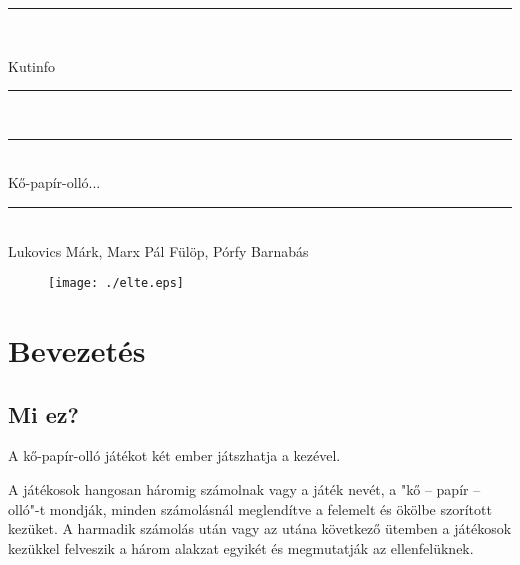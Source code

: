 \documentclass[a4paper, 12pt]{article}
\begin{document}
\begin{titlepage}   
\begin{center}
\thispagestyle{empty}  

\vspace*{0.7cm}
\rule{\linewidth}{0.5mm} \\[3mm]
\vspace*{0.7cm}

{\LARGE Kutinfo}


\vspace*{0.7cm}
\rule{\linewidth}{0.5mm} \\[3mm]
\rule{\linewidth}{0.5mm} \\[3mm]



{\Large Kő-papír-olló... \\}

\vspace*{0.7cm}
\rule{\linewidth}{0.5mm} \\[3mm]
{\footnotesize Lukovics Márk, Marx Pál Fülöp, Pórfy Barnabás} \\

  \vspace*{2cm}

\begin{figure}[h!]
\begin{center}
\texttt{[image: ./elte.eps]}
\end{center}
\end{figure}
\end{center}
\end{titlepage}

\begin{abstract}
Egyszerű kő-papír-olló játék C++-ban írva, konzolos bevitellel.
\end{abstract}

\section{Bevezetés}

\subsection{Mi ez?}
A kő-papír-olló játékot két ember játszhatja a kezével. 

A játékosok hangosan háromig számolnak vagy a játék nevét, a "kő – papír – olló"-t mondják, minden számolásnál meglendítve a felemelt és ökölbe szorított kezüket. A harmadik számolás után vagy az utána következő ütemben a játékosok kezükkel felveszik a három alakzat egyikét és megmutatják az ellenfelüknek. 
\end{document}

